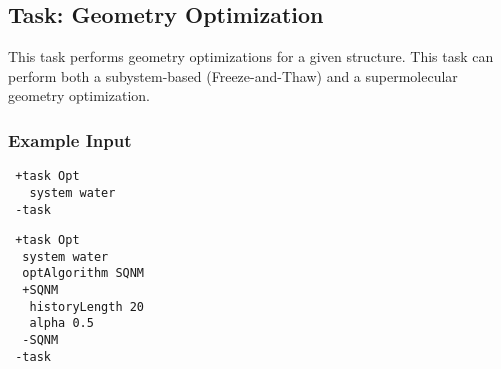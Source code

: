 \subsection{Task: Geometry Optimization}
This task performs geometry optimizations for a given structure. This task can perform both a subystem-based (Freeze-and-Thaw) and a supermolecular geometry optimization.
\subsubsection{Example Input}
\begin{lstlisting}
 +task Opt
   system water
 -task
\end{lstlisting}
\begin{lstlisting}
 +task Opt
  system water
  optAlgorithm SQNM
  +SQNM
   historyLength 20
   alpha 0.5
  -SQNM
 -task
\end{lstlisting}
